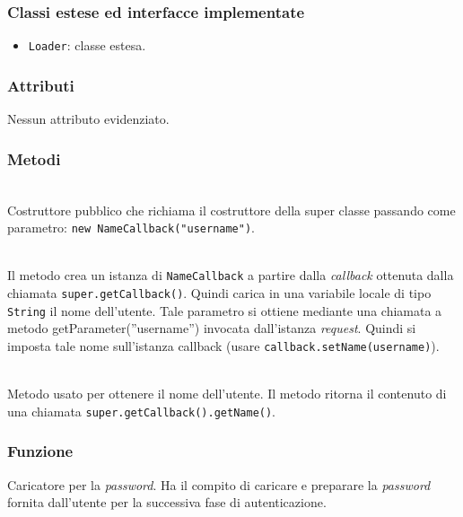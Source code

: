 \subsubsection*{Classi estese ed interfacce implementate}

\begin{itemize}
	\item \texttt{Loader}: classe estesa.
\end{itemize}

\subsubsection*{Attributi}

Nessun attributo evidenziato.

\subsubsection*{Metodi}
\begin{description}
	\item{}\\
	Costruttore pubblico che richiama il costruttore della super classe passando come parametro: \verb|new NameCallback("username")|.
	
	\item{}\\
	Il metodo crea un istanza di \texttt{NameCallback} a partire dalla \textit{callback} ottenuta dalla chiamata \verb|super.getCallback()|. Quindi carica in una variabile locale di tipo \texttt{String} il nome dell'utente. Tale parametro si ottiene mediante una chiamata a metodo getParameter(''username'') invocata dall'istanza \textit{request}. Quindi si imposta tale nome sull'istanza callback (usare \verb|callback.setName(username)|).
	
	\item{}\\
	Metodo usato per ottenere il nome dell'utente. Il metodo ritorna il contenuto di una chiamata \verb|super.getCallback().getName()|.
	
\end{description}


\subsubsection*{Funzione}
Caricatore per la \textit{password}. Ha il compito di caricare e preparare la \textit{password} fornita dall'utente per la successiva fase di autenticazione.

